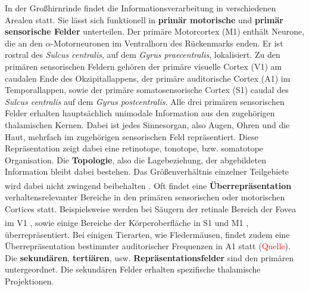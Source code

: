 \documentclass[12pt,a4paper,pdftex]{article}
\begin{document}
 In der Großhirnrinde findet die Informationsverarbeitung in verschiedenen Arealen statt. Sie lässt sich funktionell in \textbf{primär motorische} und \textbf{primär sensorische Felder} unterteilen. Der primäre Motorcortex (M1) enthält Neurone, die an den $\alpha$-Motorneuronen im Ventralhorn des Rückenmarks enden. Er ist rostral des \textit{Sulcus centralis}, auf dem \textit{Gyrus praecentralis}, lokalisiert. Zu den primären sensorischen Feldern gehören der primäre visuelle Cortex (V1) am caudalen Ende des Okzipitallappens, der primäre auditorische Cortex (A1) im Temporallappen, sowie der primäre somatosensorische Cortex (S1) caudal des \textit{Sulcus centralis} auf dem \textit{Gyrus postcentralis}. Alle drei primären sensorischen Felder erhalten hauptsächlich unimodale Information aus den zugehörigen thalamischen Kernen. Dabei ist jedes Sinnesorgan, also Augen, Ohren und die Haut, mehrfach im zugehörigen sensorischen Feld repräsentiert. Diese Repräsentation zeigt dabei eine retinotope, tonotope, bzw. somatotope Organisation. Die \textbf{Topologie}, also die Lagebeziehung, der abgebildeten Information bleibt dabei bestehen. Das Größenverhältnis einzelner Teilgebiete wird dabei nicht zwingend beibehalten \textsuperscript{\cite[14]{penzlin2005tierphys}}. Oft findet eine \textbf{Überrepräsentation} verhaltensrelevanter Bereiche in den primären sensorischen oder motorischen Cortices statt. Beispielsweise werden bei Säugern der retinale Bereich der Fovea im V1 \textsuperscript{\cite{overrepresentation_fovea}}, sowie einige Bereiche der Körperoberfläche in S1 und M1 \textsuperscript{\cite[14]{penzlin2005tierphys}}, überrepräsentiert. Bei einigen Tierarten, wie Fledermäusen, findet zudem eine Überrepräsentation bestimmter auditorischer Frequenzen in A1 statt (\textcolor{red}{Quelle}). Die \textbf{sekundären}, \textbf{tertiären}, usw. \textbf{Repräsentationsfelder} sind den primären untergeordnet. Die sekundären Felder erhalten spezifische thalamische Projektionen.\\
\end{document}
